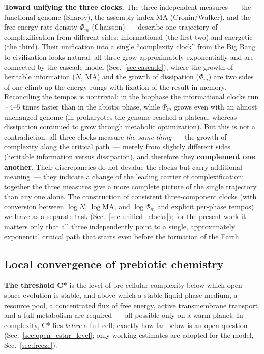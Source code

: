 \documentclass[11pt,a4paper]{article}
\begin{document}
\textbf{Toward unifying the three clocks.} The three independent measures~--- the functional genome (Sharov), the assembly index MA (Cronin/Walker), and the free-energy rate density $\Phi_m$ (Chaisson)~--- describe one trajectory of complexification from different sides: informational (the first two) and energetic (the third). Their unification into a single ``complexity clock'' from the Big Bang to civilization looks natural: all three grow approximately exponentially and are connected by the cascade model (Sec.~\ref{sec:cascade}), where the growth of heritable information ($N$, MA) and the growth of dissipation ($\Phi_m$) are two sides of one climb up the energy rungs with fixation of the result in memory. Reconciling the tempos is nontrivial: in the biophase the informational clocks run $\sim 4$--$5$ times faster than in the abiotic phase, while $\Phi_m$ grows even with an almost unchanged genome (in prokaryotes the genome reached a plateau, whereas dissipation continued to grow through metabolic optimization). But this is not a contradiction: all three clocks measure \emph{the same thing}~--- the growth of complexity along the critical path~--- merely from slightly different sides (heritable information versus dissipation), and therefore they \textbf{complement one another}. Their discrepancies do not devalue the clocks but carry additional meaning~--- they indicate a change of the leading carrier of complexification; together the three measures give a more complete picture of the single trajectory than any one alone. The construction of consistent three-component clocks (with conversion between $\log N$, $\log \mathrm{MA}$, and $\log \Phi_m$ and explicit per-phase tempos) we leave as a separate task (Sec.~\ref{sec:unified_clocks}); for the present work it matters only that all three independently point to a single, approximately exponential critical path that starts even before the formation of the Earth.

\subsection{Local convergence of prebiotic chemistry}
\label{sec:local_conv}

\textbf{The threshold C*} is the level of pre-cellular complexity below which open-space evolution is stable, and above which a stable liquid-phase medium, a resource pool, a concentrated flux of free energy, active transmembrane transport, and a full metabolism are required~--- all possible only on a warm planet. In complexity, C* lies \emph{below} a full cell; exactly how far below is an open question (Sec.~\ref{sec:open_cstar_level}; only working estimates are adopted for the model, Sec.~\ref{sec:freeze}).
\end{document}
